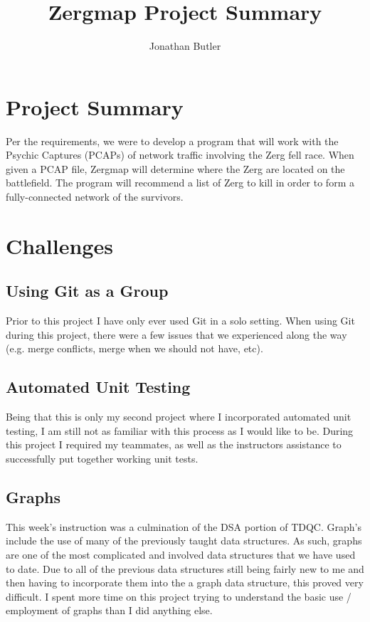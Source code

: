 \documentclass{article}
\title{Zergmap Project Summary}
\author{Jonathan Butler}
\begin{document}
\maketitle

\section{Project Summary}

Per the requirements, we were to develop a program that will work with the Psychic Captures (PCAPs) of network traffic involving the Zerg fell race. When given a PCAP file, Zergmap will determine where the Zerg are located on the battlefield. The program will recommend a list of Zerg to kill in order to form a fully-connected network of the survivors.

\section{Challenges}

\subsection{Using Git as a Group}

Prior to this project I have only ever used Git in a solo setting. When using Git during this project, there were a few issues that we experienced along the way (e.g. merge conflicts, merge when we should not have, etc).

\subsection{Automated Unit Testing}

Being that this is only my second project where I incorporated automated unit testing, I am still not as familiar with this process as I would like to be. During this project I required my teammates, as well as the instructors assistance to successfully put together working unit tests.

\subsection{Graphs}

This week's instruction was a culmination of the DSA portion of TDQC. Graph's include the use of many of the previously taught data structures. As such, graphs are one of the most complicated and involved data structures that we have used to date. Due to all of the previous data structures still being fairly new to me and then having to incorporate them into the a graph data structure, this proved very difficult. I spent more time on this project trying to understand the basic use / employment of graphs than I did anything else.
\end{document}
